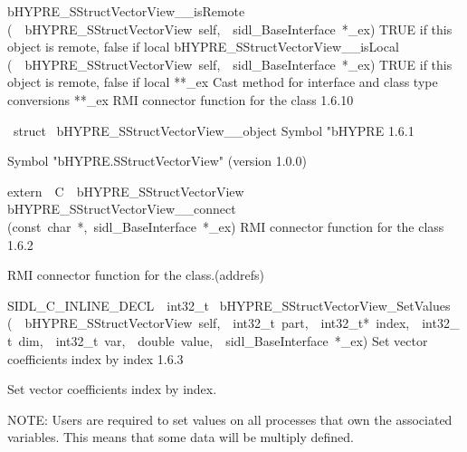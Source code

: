 \documentclass{article}
\begin{document}
\begin{cxxentry}
\begin{cxxentry}
\begin{cxxnames}
        {bHYPRE\_SStructVectorView\_\_isRemote}
        {(\ \ bHYPRE\_SStructVectorView\ self,\ \ sidl\_BaseInterface\ *\_ex)}
        {
TRUE if this object is remote, false if local}
        {}
\label{cxx.1.6.19}
        {bHYPRE\_SStructVectorView\_\_isLocal}
        {(\ \ bHYPRE\_SStructVectorView\ self,\ \ sidl\_BaseInterface\ *\_ex)}
        {
TRUE if this object is remote, false if local}
        {}
\label{cxx.1.6.20}
        {**\_ex}
        {}
        {
Cast method for interface and class type conversions}
        {}
\label{cxx.1.6.21}
        {**\_ex}
        {}
        {
RMI connector function for the class}
        {1.6.10}
\end{cxxnames}
\begin{cxxvariable}
{\ struct\ }
        {bHYPRE\_SStructVectorView\_\_object}
        {}
        {
Symbol "bHYPRE}
        {1.6.1}
\begin{cxxdoc}

Symbol "bHYPRE.SStructVectorView" (version 1.0.0)
\end{cxxdoc}
\end{cxxvariable}
\begin{cxxfunction}
{extern\ \ C\ \ bHYPRE\_SStructVectorView\ }
        {bHYPRE\_SStructVectorView\_\_connect}
        {(const\ char\ *,\ sidl\_BaseInterface\ *\_ex)}
        {
RMI connector function for the class}
        {1.6.2}
\begin{cxxdoc}

RMI connector function for the class.(addrefs)
\end{cxxdoc}
\end{cxxfunction}
\begin{cxxfunction}
{SIDL\_C\_INLINE\_DECL\ \ int32\_t\ }
        {bHYPRE\_SStructVectorView\_SetValues}
        {(\ \ bHYPRE\_SStructVectorView\ self,\ \ int32\_t\ part,\ \ int32\_t*\ index,\ \ int32\_t\ dim,\ \ int32\_t\ var,\ \ double\ value,\ \ sidl\_BaseInterface\ *\_ex)}
        {
Set vector coefficients index by index}
        {1.6.3}
\begin{cxxdoc}

Set vector coefficients index by index.

NOTE: Users are required to set values on all processes that
own the associated variables.  This means that some data will
be multiply defined.


\end{cxxdoc}
\end{cxxfunction}
\end{cxxentry}
\end{cxxentry}
\end{document}
